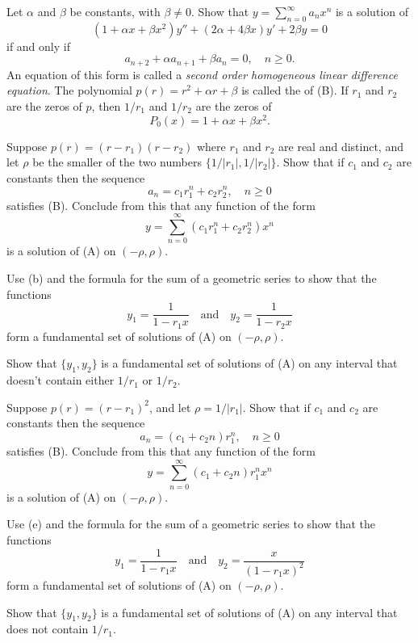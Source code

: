 \begin{exerciselist}
\item\label{exer:7.3.30}\begin{alist}
\item %
Let $\alpha$  and $\beta$  be constants, with $\beta\ne0$. Show that
$y=\sum_{n=0}^\infty a_nx^n$
is a solution of
\[
(1+\alpha x+\beta x^2)y''+(2\alpha+4\beta x)y'+2\beta y=0
\tag{A}
\]
if and only if
\[
 a_{n+2}+\alpha a_{n+1}+\beta a_n=0,\quad n\ge0.
\tag{B}
\]
An equation of this form is called a
\emph{\color{blue}second order homogeneous linear difference equation}.
The polynomial $p(r)=r^2+\alpha r+\beta$ is called the
 of (B).
If $r_1$
and $r_2$ are the zeros of $p$, then $1/r_1$ and $1/r_2$ are the
zeros of
\[
P_0(x)=1+\alpha x+\beta x^2.
\]
\item %
Suppose  $p(r)=(r-r_1)(r-r_2)$ where $r_1$ and $r_2$ are real
and distinct, and
let $\rho$ be the smaller of the two numbers $\{1/|r_1|,1/|r_2|\}$. Show
that if  $c_1$  and $c_2$ are constants then the sequence
\[
a_n=c_1r_1^n+c_2r_2^n,\quad n\ge0
\]
satisfies (B). Conclude from this that any function of the form
\[
y=\sum_{n=0}^\infty (c_1r_1^n+c_2r_2^n)x^n
\]
is a solution of (A) on $(-\rho,\rho)$.
\item %
Use (b)  and the formula for the sum of a geometric series to show
that
the functions
\[
y_1=\frac{1}{1-r_1x}\quad\text{and}\quad y_2=\frac{1}{1-r_2x}
\]
form a fundamental set of solutions of (A) on $(-\rho,\rho)$.
\item %
Show that $\{y_1,y_2\}$ is
a fundamental set of solutions of (A) on any interval that
doesn't contain either $1/r_1$ or $1/r_2$.
\item %
Suppose  $p(r)=(r-r_1)^2$, and let $\rho=1/|r_1|$.
Show that if   $c_1$  and $c_2$ are constants then the sequence
\[
a_n=(c_1+c_2n)r_1^n,\quad n\ge0
\]
satisfies (B). Conclude from this that any function of the form
\[
y=\sum_{n=0}^\infty (c_1+c_2n)r_1^nx^n
\]
is a solution of (A) on $(-\rho,\rho)$.
\item %
Use (e)  and the formula for the sum of a geometric series to show
that the functions
\[
y_1=\frac{1}{1-r_1x}\quad\text{and}\quad y_2=\frac{x}{(1-r_1x)^2}
\]
form a fundamental set of solutions of (A) on $(-\rho,\rho)$.
\item %
Show that $\{y_1,y_2\}$ is
 a fundamental set of solutions of (A) on any interval that
does not contain $1/r_1$.
\end{alist}


\end{exerciselist}
